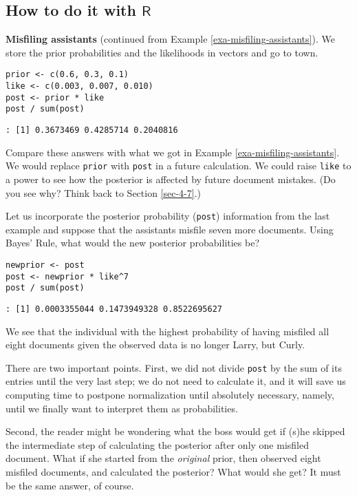 \subsection{How to do it with \(\mathsf{R}\)}
\label{sec-4-8-1}

\textbf{Misfiling assistants} (continued from Example \ref{exa-misfiling-assistants}). We store the prior probabilities and the likelihoods in
vectors and go to town.

\begin{Verbatim}
prior <- c(0.6, 0.3, 0.1)
like <- c(0.003, 0.007, 0.010)
post <- prior * like
post / sum(post)
\end{Verbatim}

\begin{verbatim}
: [1] 0.3673469 0.4285714 0.2040816
\end{verbatim}


Compare these answers with what we got in Example \ref{exa-misfiling-assistants}. We would replace \texttt{prior} with \texttt{post} in a future
calculation. We could raise \texttt{like} to a power to see how the posterior
is affected by future document mistakes. (Do you see why? Think back
to Section \ref{sec-4-7}.)



Let us incorporate the posterior probability (\texttt{post}) information from
the last example and suppose that the assistants misfile seven more
documents. Using Bayes' Rule, what would the new posterior
probabilities be?

\begin{Verbatim}
newprior <- post
post <- newprior * like^7
post / sum(post)
\end{Verbatim}

\begin{verbatim}
: [1] 0.0003355044 0.1473949328 0.8522695627
\end{verbatim}

We see that the individual with the highest probability of having
misfiled all eight documents given the observed data is no longer
Larry, but Curly.

There are two important points. First, we did not divide \texttt{post} by the
sum of its entries until the very last step; we do not need to
calculate it, and it will save us computing time to postpone
normalization until absolutely necessary, namely, until we finally
want to interpret them as probabilities.

Second, the reader might be wondering what the boss would get if (s)he
skipped the intermediate step of calculating the posterior after only
one misfiled document. What if she started from the \emph{original} prior,
then observed eight misfiled documents, and calculated the posterior?
What would she get? It must be the same answer, of course.

